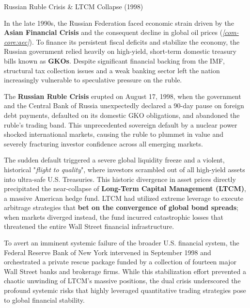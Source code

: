 \documentclass[10pt]{article}
\begin{document}
    \begin{core}{Russian Ruble Crisis \& LTCM Collapse (1998)}

      In the late 1990s, the Russian Federation faced economic strain driven by the \textbf{Asian Financial Crisis} and the consequent decline in global oil prices (\textit{\autoref{com-core:aec}}). To finance its persistent fiscal deficits and stabilize the economy, the Russian government relied heavily on high-yield, short-term domestic treasury bills known as \textbf{GKOs}. Despite significant financial backing from the IMF, structural tax collection issues and a weak banking sector left the nation increasingly vulnerable to speculative pressure on the ruble.

      The \textbf{Russian Ruble Crisis} erupted on August 17, 1998, when the government and the Central Bank of Russia unexpectedly declared a 90-day pause on foreign debt payments, defaulted on its domestic GKO obligations, and abandoned the ruble's trading band. This unprecedented sovereign default by a nuclear power shocked international markets, causing the ruble to plummet in value and severely fracturing investor confidence across all emerging markets.

      The sudden default triggered a severe global liquidity freeze and a violent, historical "\textit{flight to quality}", where investors scrambled out of all high-yield assets into ultra-safe U.S. Treasuries. This historic divergence in asset prices directly precipitated the near-collapse of \textbf{Long-Term Capital Management (LTCM)}, a massive American hedge fund. LTCM had utilized extreme leverage to execute arbitrage strategies that \textbf{bet on the convergence of global bond spreads}; when markets diverged instead, the fund incurred catastrophic losses that threatened the entire Wall Street financial infrastructure.


      To avert an imminent systemic failure of the broader U.S. financial system, the Federal Reserve Bank of New York intervened in September 1998 and orchestrated a private rescue package funded by a collection of fourteen major Wall Street banks and brokerage firms. While this stabilization effort prevented a chaotic unwinding of LTCM's massive positions, the dual crisis underscored the profound systemic risks that highly leveraged quantitative trading strategies pose to global financial stability.

    \end{core}
\end{document}
